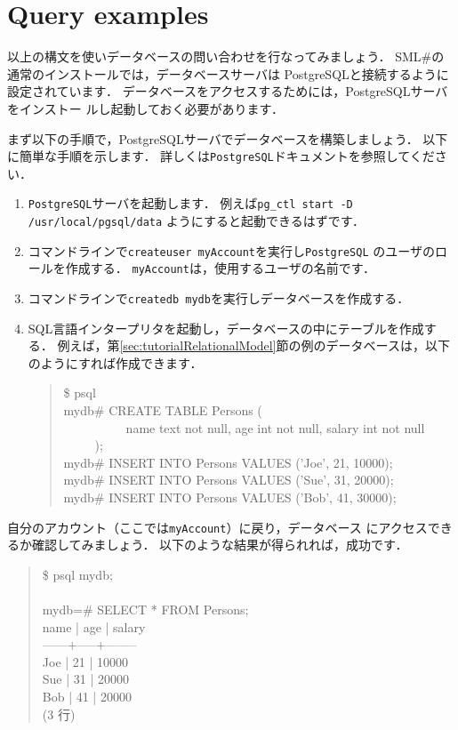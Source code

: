 \documentclass{jbook}
\newcommand{\txt}[2]{#2}
\newcommand{\smlsharp}{SML\#}
\newenvironment{program}{\begin{tt}\begin{quote}}{\end{quote}\end{tt}}
\newcommand{\myem}{\ \ \ \ \  }
\begin{document}
\section{\txt{データベース問い合わせ実行例}{Query examples}}
\label{sec:tutorialSQLExample}

\ifx\jp%
	以上の構文を使いデータベースの問い合わせを行なってみましょう．
	\smlsharp{}の通常のインストールでは，データベースサーバは
PostgreSQLと接続するように設定されています．
	データベースをアクセスするためには，PostgreSQLサーバをインストー
ルし起動しておく必要があります． 
	
	まず以下の手順で，PostgreSQLサーバでデータベースを構築しましょう．
	以下に簡単な手順を示します．
	詳しくは{\tt PostgreSQL}ドキュメントを参照してください．
\begin{enumerate}
\item {\tt PostgreSQL}サーバを起動します．
	例えば{\tt pg\_ctl start -D /usr/local/pgsql/data}
ようにすると起動できるはずです．
\item コマンドラインで{\tt createuser myAccount}を実行し{\tt PostgreSQL}
のユーザのロールを作成する．
	{\tt myAccount}は，使用するユーザの名前です．
\item 
コマンドラインで{\tt createdb mydb}を実行しデータベースを作成する．
\begin{quote}

\end{quote}
\item SQL言語インタープリタを起動し，データベースの中にテーブルを作成す
る．
	例えば，第\ref{sec:tutorialRelationalModel}節の例のデータベースは，以下
のようにすれば作成できます．
\begin{program}
\$ psql\\
mydb\# CREATE TABLE Persons (\\
\myem\myem name text not null, age int not null, salary int not null
\myem );\\
mydb\# INSERT INTO Persons VALUES ('Joe', 21, 10000);\\
mydb\# INSERT INTO Persons VALUES ('Sue', 31, 20000);\\
mydb\# INSERT INTO Persons VALUES ('Bob', 41, 30000);\\
\end{program}
\end{enumerate}
	自分のアカウント（ここでは{\tt myAccount}）に戻り，データベース
にアクセスできるか確認してみましょう．
	以下のような結果が得られれば，成功です．
\begin{program}
\$ psql mydb;\\
\\
mydb=\# SELECT * FROM Persons;\\
 name | age | salary \\
------+-----+--------\\
 Joe  |  21 |  10000\\
 Sue  |  31 |  20000\\
 Bob  |  41 |  20000\\
(3 行)
\end{program}
\end{document}
